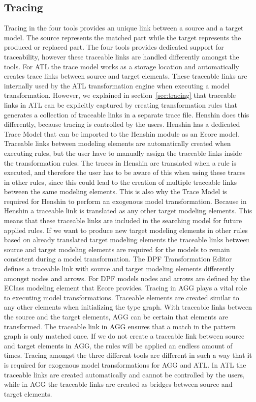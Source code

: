 \subsection{Tracing}

Tracing in the four tools provides an unique link between a source and a target
model.	
The source represents the matched part while the target represents the
produced or replaced part. The four tools provides dedicated support for
traceability, however these traceable links are handled differently amongst
the tools. For ATL the trace model works as a storage location and automatically
creates trace links between source and target elements. These traceable links
are internally used by the ATL transformation engine when executing a model
transformation. However, we explained in section~\ref{sec:tracing} that traceable
links in ATL can be explicitly captured by creating transformation rules that
generates a collection of traceable links in a separate trace file. Henshin does this
differently, because tracing is controlled by the users. Henshin has a
dedicated Trace Model that can be imported to the Henshin module as an Ecore
model. Traceable links between modeling elements are automatically created when
executing rules, but the user have to manually assign the traceable links inside the
transformation rules. The traces in Henshin are translated when a rule is
executed, and therefore the user has to be aware of this when using these
traces in other rules, since this could lead to the creation of multiple
traceable links between the same modeling elements. This is also why the Trace
Model is required for Henshin to perform an exogenous model transformation. Because in
Henshin a traceable link is translated as any other target modeling elements.
This means that these traceable links are included in the searching model for
future applied rules. If we want to produce new target modeling elements in
other rules based on already translated target modeling elements the traceable
links between source and target modeling elements are required for the models to
remain consistent during a model transformation. The DPF Transformation Editor
defines a traceable link with source and target modeling elements differently
amongst nodes and arrows. For DPF models nodes and arrows are defined by
the EClass modeling element that Ecore provides. Tracing in AGG plays a vital role
to executing model transformations. Traceable elements are created similar to
any other elements when initializing the type graph. With traceable links
between the source and the target elements, AGG can be certain that elements
are transformed. The traceable link in AGG ensures that a match in the pattern
graph is only matched once. If we do not create a traceable link between source
and target elements in AGG, the rules will be applied an endless amount of
times. Tracing amongst the three different tools are different in such a way
that it is required for exogenous model transformations for AGG and ATL. In ATL
the traceable links are created automatically and cannot be controlled by the
users, while in AGG the traceable links are created as bridges between source
and target elements.

